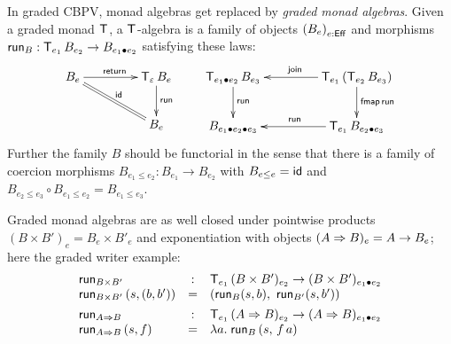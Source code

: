 \documentclass[acmsmall,review,anonymous]{acmart}\settopmatter{printfolios=true,printccs=false,printacmref=false}
\begin{document}
In graded CBPV, monad algebras get replaced by \emph{graded monad
  algebras}.  Given a graded monad $\T$, a $\T$-algebra is a family of
objects $\left(B_e\right)_{e:\Eff}$ and morphisms
$\run[B] : \T[e_1]\,B_{e_2} \to B_{e_1 \bu e_2}$ satisfying these
laws:
\[
\xymatrix@C=10ex{
  B_e     \ar[r]^{\treturn} \ar@{=}[dr]^{\tid}
& \T[\Ge]\,B_e \ar[d]^{\run[]}
\\
& B_e
}
\qquad
\xymatrix@C=10ex{
  \T[e_1 \bu e_2]\,B_{e_3} \ar[d]^{\run[]}
& \T[e_1]\,(\T[e_2]\,B_{e_3}) \ar[l]_{\tjoin} \ar[d]^{\tfmap\,\run[]}
\\
  B_{e_1 \bu e_2 \bu e_3}
& \T[e_1]\,B_{e_2 \bu e_3} \ar[l]_{\run[]}
}
\]
Further the family $B$ should be functorial in the sense that there is
a family of coercion morphisms $B_{e_1 \leq e_2} : B_{e_1} \to B_{e_2}$ with
$B_{e \leq e} = \tid$ and $B_{e_2 \leq e_3} \circ B_{e_1 \leq e_2} =
B_{e_1 \leq e_3}$.

Graded monad algebras are as well closed under
pointwise products $(B \times B')_e = B_e \times B'_e$ and
exponentiation with objects $(A \To B)_e = A \to B_e$;
here the graded writer example:
\[
\begin{array}{lcl}
  \run[B \times B'] & : & \T[e_1]\,(B \times B')_{e_2} \to (B \times
                          B')_{e_1 \bu e_2} \\
  \run[B \times B']\, (s,(b,b')) & = & (\run[B] (s,b),\
                                           \run[B'] (s,b'))
\\[1ex]
  \run[A \To B] & : & \T[e_1]\,(A \To B)_{e_2} \to (A \To B)_{e_1 \bu e_2} \\
  \run[A \To B]\, (s,f) & = & \lambda a.\; \run[B]\,(s,\,f\,a)
\\
\end{array}
\]
\end{document}
